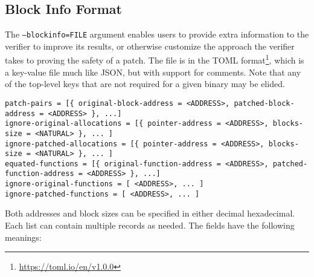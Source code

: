 \subsection{Block Info Format}\label{sec:options:block-info}

The \texttt{--blockinfo=FILE} argument enables users to provide extra information to the verifier to improve its results, or otherwise customize the approach the verifier takes to proving the safety of a patch.  The file is in the TOML format\footnote{\url{https://toml.io/en/v1.0.0}}, which is a key-value file much like JSON, but with support for comments.  Note that any of the top-level keys that are not required for a given binary may be elided.

\begin{lstlisting}
patch-pairs = [{ original-block-address = <ADDRESS>, patched-block-address = <ADDRESS> }, ...]
ignore-original-allocations = [{ pointer-address = <ADDRESS>, blocks-size = <NATURAL> }, ... ]
ignore-patched-allocations = [{ pointer-address = <ADDRESS>, blocks-size = <NATURAL> }, ... ]
equated-functions = [{ original-function-address = <ADDRESS>, patched-function-address = <ADDRESS> }, ...]
ignore-original-functions = [ <ADDRESS>, ... ]
ignore-patched-functions = [ <ADDRESS>, ... ]
\end{lstlisting}

Both addresses and block sizes can be specified in either decimal hexadecimal.  Each list can contain multiple records as needed.  The fields have the following meanings:

